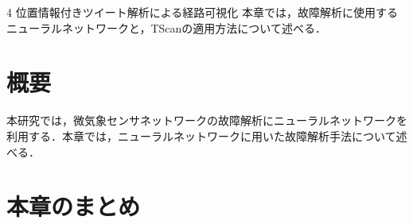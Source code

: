 \chapterhead
{4}
{位置情報付きツイート解析による経路可視化}
{本章では，故障解析に使用するニューラルネットワークと，TScanの適用方法について述べる．}

\section{概要}
本研究では，微気象センサネットワークの故障解析にニューラルネットワークを利用する．本章では，ニューラルネットワークに用いた故障解析手法について述べる．

\newpage

\section{本章のまとめ}





\newpage
